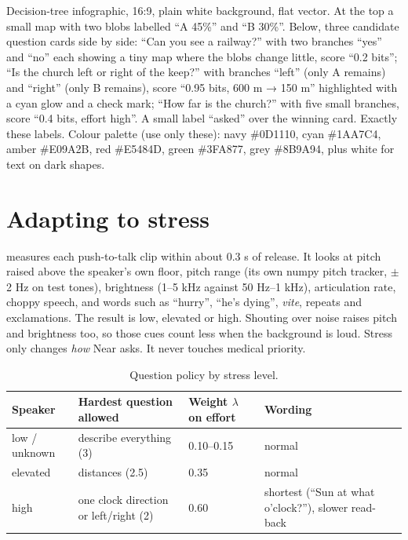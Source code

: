 {Decision-tree infographic, 16:9, plain white background, flat vector. At the top a small map with two
blobs labelled ``A 45\%'' and ``B 30\%''. Below, three candidate question cards side by side: ``Can you see a railway?''
with two branches ``yes'' and ``no'' each showing a tiny map where the blobs change little, score ``0.2 bits'';
``Is the church left or right of the keep?'' with branches ``left'' (only A remains) and ``right'' (only B remains),
score ``0.95 bits, 600 m → 150 m'' highlighted with a cyan glow and a check mark; ``How far is the church?'' with five
small branches, score ``0.4 bits, effort high''. A small label ``asked'' over the winning card. Exactly these labels. Colour palette (use only these): navy \#0D1110, cyan \#1AA7C4, amber \#E09A2B, red \#E5484D, green \#3FA877, grey \#8B9A94, plus white for text on dark shapes.}

\section{Adapting to stress}

 measures each push-to-talk clip within about 0.3 s of release. It looks at pitch raised
above the speaker's own floor, pitch range (its own numpy pitch tracker, $\pm$2 Hz on test tones),
brightness (1--5 kHz against 50 Hz--1 kHz), articulation rate, choppy speech, and words such as ``hurry'',
``he's dying'', \emph{vite}, repeats and exclamations. The result is low, elevated or high. Shouting over
noise raises pitch and brightness too, so those cues count less when the background is loud. Stress only
changes \emph{how} Near asks. It never touches medical priority.

\begin{table}[htbp]\centering\small
\caption{Question policy by stress level.}\label{tab:stress}
\begin{tabular}{llll}
\toprule
Speaker & Hardest question allowed & Weight $\lambda$ on effort & Wording\\
\midrule
low / unknown & describe everything (3) & 0.10--0.15 & normal\\
elevated & distances (2.5) & 0.35 & normal\\
high & one clock direction or left/right (2) & 0.60 & shortest (``Sun at what o'clock?''), slower read-back\\
\bottomrule
\end{tabular}
\end{table}

